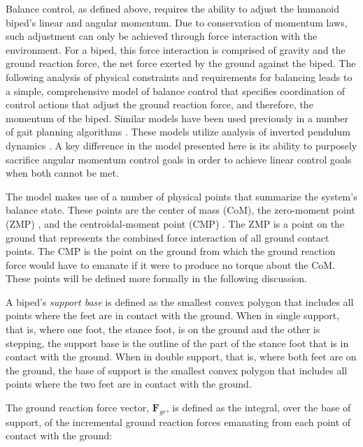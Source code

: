 \documentclass{llncs}
\begin{document}
Balance control, as defined above, requires the ability to adjust the humanoid biped’s linear and angular momentum.  
Due to conservation of momentum laws, such adjustment can only be achieved through force interaction with the environment.  
For a biped, this force interaction is comprised of gravity and the ground reaction force, the net force exerted by the ground against the biped.  
The following analysis of physical constraints and requirements for balancing leads to a simple, comprehensive model of balance control that specifies 
coordination of control actions that adjust the ground reaction force, and therefore, the momentum of the biped.
Similar models have been used previously in a number of gait planning algorithms 
\cite{kajita2001real, yokoi2001honda, sugihara2002real, nishiwaki2002online}.
These models utilize analysis of inverted pendulum dynamics \cite{formal2006inverted}.
A key difference in the model presented here is its ability to 
purposely sacrifice angular momentum control goals in order to achieve linear control goals when both cannot be met.  

The model makes use of a number of physical points that summarize the system’s balance state.  
These points are the center of mass (CoM), the zero-moment point (ZMP) \cite{vukobratovic69},
and the centroidal-moment point (CMP) \cite{popovic2005ground}.  
The ZMP is a point on the ground that represents the combined force interaction of all ground contact points.  
The CMP is the point on the ground from which the ground reaction force would have to emanate if it were to produce no torque about the CoM. 
These points will be defined more formally in the following discussion.

A biped’s \textit{support base} is defined as the smallest convex polygon that includes all points where the feet are in contact with the ground.  
When in single support, that is, where one foot, the stance foot, is on the ground and the other is stepping, the support base is the outline of the part of 
the stance foot that is in contact with the ground.  
When in double support, that is, where both feet are on the ground, the base of support is the smallest convex polygon that includes all points where the two feet are in 
contact with the ground.  

The ground reaction force vector, $\mathbf{F}_{gr}$, is defined as the integral, over the base of support, of the incremental ground reaction forces emanating from each 
point of contact with the ground:
\end{document}
